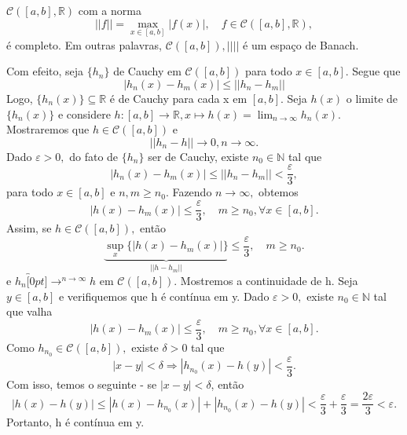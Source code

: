 \documentclass[MetricSpaces/metric_notes.tex]{subfiles}
\begin{document}
\begin{example}
	\(\mathcal{C}([a, b], \mathbb{R})\) com a norma
	\[
		||f|| = \max_{x\in [a, b]}|f(x)|,\quad f\in \mathcal{C}([a, b], \mathbb{R}),
	\]
	é completo. Em outras palavras, \(\mathcal{C}([a, b]), ||||\) é um espaço de Banach.

	Com efeito, seja \(\{h_{n}\}\) de Cauchy em \(\mathcal{C}([a, b])\) para todo \(x\in [a, b]\). Segue que
	\[
		|h_{n}(x) - h_{m}(x)|\leq ||h_{n}-h_{m}||
	\]
	Logo, \(\{h_{n}(x)\}\subseteq{\mathbb{R}}\) é de Cauchy para cada x em \([a, b]\). Seja \(h(x)\) o limite de \(\{h_{n}(x)\}\) e
	considere \(h:[a, b]\rightarrow \mathbb{R}, x\mapsto h(x) = \lim_{n\to \infty}h_{n}(x).\) Mostraremos que \(h\in \mathcal{C}([a, b])\) e
	\[
		||h_{n}-h|| \rightarrow 0, n\rightarrow \infty.
	\]
	Dado \(\varepsilon >0,\) do fato de \(\{h_{n}\}\) ser de Cauchy, existe \(n_{0}\in \mathbb{N}\) tal que
	\[
		|h_{n}(x) - h_{m}(x)|\leq ||h_{n}-h_{m}|| < \frac{\varepsilon }{3},
	\]
	para todo \(x\in[a, b]\) e \(n, m\geq n_{0}\). Fazendo \(n\longrightarrow \infty,\) obtemos
	\[
		|h(x)-h_{m}(x)|\leq \frac{\varepsilon }{3},\quad m\geq n_{0}, \forall x\in[a, b].
	\]
	Assim, se \(h\in \mathcal{C}([a, b]), \) então
	\[
		\underbrace{\sup_{x}\{|h(x) - h_{m}(x)|\}}_{||h-h_{m}||}\leq \frac{\varepsilon }{3},\quad m\geq n_{0}.
	\]
	e \(h_{n}\overbracket[0pt]{\longrightarrow}^{n\to \infty}h\) em \(\mathcal{C}([a, b]).\) Mostremos a continuidade de h.
	Seja \(y\in [a, b]\) e verifiquemos que h é contínua em y. Dado \(\varepsilon >0,\) existe \(n_{0}\in \mathbb{N}\) tal que
	valha
	\[
		|h(x)-h_{m}(x)|\leq \frac{\varepsilon }{3},\quad m\geq n_{0}, \forall x\in[a, b].
	\]
	Como \(h_{n_{0}}\in \mathcal{C}([a, b]),\) existe \(\delta > 0\) tal que
	\[
		|x-y| < \delta \Rightarrow |h_{n_{0}}(x) - h(y)| < \frac{\varepsilon }{3}.
	\]
	Com isso, temos o seguinte - se \(|x-y| < \delta \), então
	\[
		|h(x)-h(y)|\leq |h(x)-h_{n_{0}}(x)| + |h_{n_{0}}(x) - h(y)| < \frac{\varepsilon }{3} + \frac{\varepsilon }{3} = \frac{2\varepsilon }{3} < \varepsilon .
	\]
	Portanto, h é contínua em y.
\end{example}
\end{document}
